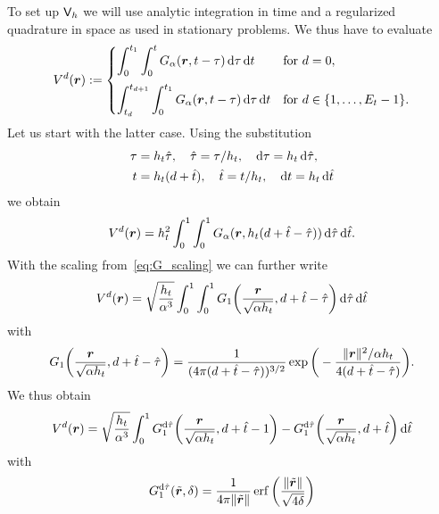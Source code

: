 \documentclass[a4paper,11pt]{article}
\begin{document}
To set up ${{\mathsf{V}}}_h$ we will use analytic integration in time and a regularized quadrature in space as used in stationary problems. We thus have to evaluate
\begin{equation}
\label{eq:V_d}
  V^d({{\bm{r}}}) := 
  \begin{cases}
  \displaystyle
    \int_{0}^{t_1} \int_{0}^{t} G_\alpha({{\bm{r}}},t-\tau) \,{\mathrm{d}}\tau \,{\mathrm{d}} t & \text{for } d = 0, \\[4mm]
  \displaystyle
    \int_{t_d}^{t_{d+1}} \int_{0}^{t_1} G_\alpha({{\bm{r}}},t-\tau) \,{\mathrm{d}}\tau \,{\mathrm{d}} t & \text{for } d \in \{1,\ldots,E_t-1\}.
  \end{cases}
\end{equation}
Let us start with the latter case. Using the substitution
\begin{equation}
\label{eq:subst_tau_t}
\begin{aligned}
  \tau &= h_t \hat\tau, \quad \hat\tau = \tau/h_t, \quad {\mathrm{d}}\tau = h_t\,{\mathrm{d}}\hat\tau, \\
  t &= h_t (d+\hat t), \quad \hat t = t/h_t, \quad {\mathrm{d}} t = h_t\,{\mathrm{d}}\hat t
\end{aligned}
\end{equation}
we obtain
\begin{equation*}
  V^d({{\bm{r}}}) = h_t^2 \int_{0}^{1} \int_{0}^{1} G_\alpha({{\bm{r}}},h_t(d+\hat t-\hat\tau)) \,{\mathrm{d}}\hat\tau \,{\mathrm{d}}\hat t.
\end{equation*}
With the scaling from~\eqref{eq:G_scaling} we can further write
\begin{equation*}
  V^d({{\bm{r}}}) = \sqrt{\frac{h_t}{\alpha^3}} \int_{0}^{1} \int_{0}^{1} G_1\bigg(\frac{{{\bm{r}}}}{\sqrt{\alpha h_t}},d+\hat t-\hat\tau\bigg) \,{\mathrm{d}}\hat\tau \,{\mathrm{d}}\hat t
\end{equation*}
with 
\begin{equation*}
  G_1\bigg(\frac{{{\bm{r}}}}{\sqrt{\alpha h_t}},d+\hat t-\hat\tau\bigg) = \frac{1}{(4\pi(d+\hat t-\hat\tau))^{3/2}}\exp\bigg( -\frac{\|{{\bm{r}}}\|^2/\alpha h_t}{4(d+\hat t-\hat\tau)} \bigg).
\end{equation*}
We thus obtain
\begin{equation*}
  V^d({{\bm{r}}}) = \sqrt{\frac{h_t}{\alpha^3}} \int_{0}^{1} G^{{\mathrm{d}} \hat\tau}_1\bigg(\frac{{{\bm{r}}}}{\sqrt{\alpha h_t}},d+\hat t-1\bigg) - G^{{\mathrm{d}} \hat\tau}_1\bigg(\frac{{{\bm{r}}}}{\sqrt{\alpha h_t}},d+\hat t\bigg) \,{\mathrm{d}}\hat t
\end{equation*}
with
\begin{equation}
  \label{eq:G_dtau}
  G^{{\mathrm{d}} \hat\tau}_1(\tilde{{{\bm{r}}}},\delta) = \frac{1}{4\pi \|\tilde {{{\bm{r}}}}\|} \operatorname{erf}\bigg( \frac{\|\tilde {{{\bm{r}}}}\|}{\sqrt{4\delta}} \bigg)
\end{equation}
\end{document}
